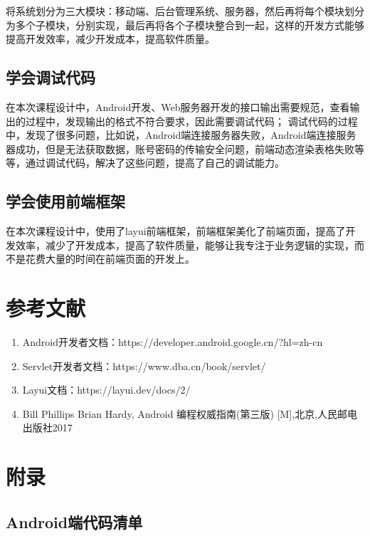 \documentclass[UTF8,12pt]{article}
\begin{document}
将系统划分为三大模块：移动端、后台管理系统、服务器，然后再将每个模块划分为多个子模块，分别实现，最后再将各个子模块整合到一起，这样的开发方式能够提高开发效率，减少开发成本，提高软件质量。

\subsection{学会调试代码}
在本次课程设计中，Android开发、Web服务器开发的接口输出需要规范，查看输出的过程中，发现输出的格式不符合要求，因此需要调试代码；
调试代码的过程中，发现了很多问题，比如说，Android端连接服务器失败，Android端连接服务器成功，但是无法获取数据，账号密码的传输安全问题，前端动态渲染表格失败等等，通过调试代码，解决了这些问题，提高了自己的调试能力。

\subsection{学会使用前端框架}
在本次课程设计中，使用了layui前端框架，前端框架美化了前端页面，提高了开发效率，减少了开发成本，提高了软件质量，能够让我专注于业务逻辑的实现，而不是花费大量的时间在前端页面的开发上。

\newpage

\section{参考文献}

\begin{enumerate}
    \item Android开发者文档：https://developer.android.google.cn/?hl=zh-cn
    \item Servlet开发者文档：https://www.dba.cn/book/servlet/
    \item Layui文档：https://layui.dev/docs/2/
    \item Bill Phillips Brian Hardy, Android 编程权威指南(第三版) [M],北京,人民邮电出版社2017
\end{enumerate}

\newpage

\section{附录}
\subsection{Android端代码清单}
\end{document}
